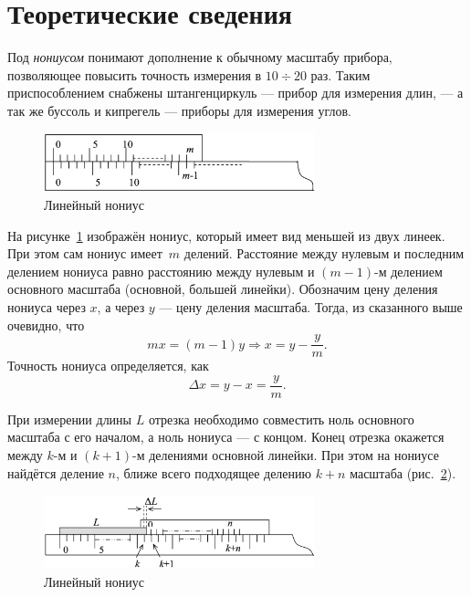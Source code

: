 \section{Теоретические сведения}

Под \textit{нониусом} понимают дополнение к обычному масштабу прибора, позволяющее повысить точность измерения в $10\div20$ раз. Таким приспособлением снабжены штангенциркуль --- прибор для измерения длин, --- а так же буссоль и кипрегель --- приборы для измерения углов.

\begin{figure}[h]
	\begin{center}
		\includegraphics[width=0.7\textwidth]{pictures/PictureOne}
		\caption{Линейный нониус}\label{PicOne}
	\end{center}
\end{figure}

На рисунке~\ref{PicOne} изображён нониус, который имеет вид меньшей из двух линеек. При этом сам нониус имеет~$m$ делений. Расстояние между нулевым и последним делением нониуса равно расстоянию между нулевым и $(m-1)$-м делением основного масштаба (основной, большей линейки). Обозначим цену деления нониуса через $x$, а через $y$ --- цену деления масштаба. Тогда, из сказанного выше очевидно, что
\[
mx=(m-1)y\Rightarrow x=y- \frac{y}{m}.
\]
Точность нониуса определяется, как
\[
\Delta x=y-x=\frac{y}{m}.
\]

При измерении длины $L$ отрезка необходимо совместить ноль основного масштаба с его началом, а ноль нониуса --- с концом. Конец отрезка окажется между $k$-м и $(k+1)$-м делениями основной линейки. При этом на нониусе найдётся деление $n$, ближе всего подходящее делению $k+n$ масштаба (рис.~\ref{PicTwo}).

\begin{figure}[h]
	\begin{center}
		\includegraphics[width=0.7\textwidth]{pictures/PictureTwo}
		\caption{Линейный нониус}\label{PicTwo}
	\end{center}
\end{figure}

